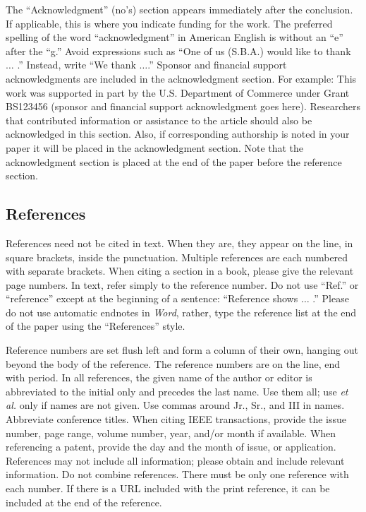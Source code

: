 \documentclass{IEEEcsmag}
\begin{document}
The ``Acknowledgment'' (no's) section appears immediately after the conclusion. If applicable, this is where you indicate funding for the work. The preferred spelling of the word ``acknowledgment'' in American English is without an ``e'' after the ``g.'' Avoid expressions such as ``One of us (S.B.A.) would like to thank $\ldots$ .'' Instead, write ``We thank $\ldots$.'' Sponsor and financial support acknowledgments are included in the acknowledgment section. For example: This work was supported in part by the U.S. Department of Commerce under Grant BS123456 (sponsor and financial support acknowledgment goes here). Researchers that contributed information or assistance to the article should also be acknowledged in this section. Also, if corresponding authorship is noted in your paper it will be placed in the acknowledgment section. Note that the acknowledgment section is placed at the end of the paper before the reference section.

\subsection{References}


References need not be cited in text. When they are, they appear on the 
line, in square brackets, inside the punctuation. Multiple references are 
each numbered with separate brackets. When citing a section in a book, 
please give the relevant page numbers. In text, refer simply to the 
reference number. Do not use ``Ref.'' or ``reference'' except at the 
beginning of a sentence: ``Reference  shows $\ldots$ .'' Please do not use 
automatic endnotes in \emph{Word}, rather, type the reference list at the end of the 
paper using the ``References'' style.

Reference numbers are set flush left and form a column of their own, hanging 
out beyond the body of the reference. The reference numbers are on the line, 
end with period. In all references, the given name of the author 
or editor is abbreviated to the initial only and precedes the last name. Use 
them all; use \emph{et al.} only if names are not given. Use commas around Jr., 
Sr., and III in names. Abbreviate conference titles. When citing IEEE 
transactions, provide the issue number, page range, volume number, year, 
and/or month if available. When referencing a patent, provide the day and 
the month of issue, or application. References may not include all 
information; please obtain and include relevant information. Do not combine 
references. There must be only one reference with each number. If there is a 
URL included with the print reference, it can be included at the end of the 
reference. 
\end{document}
